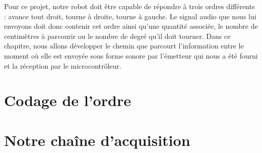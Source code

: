 Pour ce projet, notre robot doit être capable de répondre à trois ordres différents : avance tout droit, tourne à droite, tourne à gauche. Le signal audio que nous lui envoyons doit donc contenir cet ordre ainsi qu'une quantité associée, le nombre de centimètres à parcourir ou le nombre de degré qu'il doit tourner. Dans ce chapitre, nous allons développer le chemin que parcourt l'information entre le moment où elle est envoyée sous forme sonore par l'émetteur qui nous a été fourni et la réception par le microcontrôleur.

\section{Codage de l'ordre}
\section{Notre chaîne d'acquisition}
